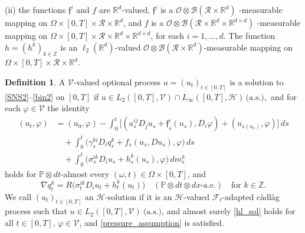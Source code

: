 \documentclass[11pt,reqno]{amsart}
\theoremstyle{definition}
\newtheorem{definition}{Definition}[section]
\theoremstyle{remark}
\newcommand\bR{\mathbb{R}}
\newcommand\bP{\mathbb{P}}
\newcommand\bZ{\mathbb{Z}}
\newcommand\frf{\mathfrak{f}}
\newcommand\cB{\mathcal{B}}
\newcommand\cO{\mathcal{O}}
\newcommand\cR{\mathcal{R}}
\newcommand{\<}{\langle}
\renewcommand{\>}{\rangle}
\begin{document}
(ii)
the functions
$\frf^i$ and $f$ are $\bR^d$-valued,
$\frf^i$ is a $\cO\otimes\mathcal B(\cR\times\bR^d)$ -measurable 
mapping on $\Omega\times[0,T]\times\cR\times\bR^d$, 
and $f$ is a $\cO\otimes\cB(\cR\times\bR^d\times\bR^{d\times d})$
-measurable mapping on 
$\Omega\times[0,T]\times\cR\times\bR^d\times\bR^{d\times d}$,
for each $i=1,\dots,d$. The function $h=(h^k)_{k\in\bZ}$ is an $\ell_2(\mathbb R^d)$-valued
$\cO\otimes\mathcal B(\cR\times\mathbb R^d)$-measurable mapping on
$\Omega\times[0,T]\times\cR\times\bR^d$. 

\begin{definition}
                                                            \label{hl_def}
A $\mathcal V$-valued optional process
$u=(u_t)_{t\in[0,T]}$
is a solution to \eqref{SNS2}--\eqref{bin2} on $[0,T]$ if
$u\in L_2([0,T],\mathcal V)\cap L_\infty([0,T],\mathcal H)\, \text{(a.s.)}, $
and for each
$\varphi\in\mathcal V$
the identity
\begin{equation} 
                                             \label{hl_sol}
\begin{aligned}
(u_t,\varphi)&=(u_0,\varphi)-
\int_0^t\Big[(a_s^{ij}D_j u_s+\mathfrak{f}_s^i(u_s),D_i \varphi)
+(u_{s(u_s)},\varphi)\Big]\,ds                              \\
&\quad
+\int_0^t\big(\gamma_s^{ki}D_i q_s^k+f_s(u_s,Du_s),\varphi\big)\,ds\\
&\quad
+\int_0^t\big(\sigma_s^{ik}D_i u_s+h_s^k(u_s),\varphi\big)\,dm_s^k
\end{aligned}
\end{equation}
holds for $\mathbb P\otimes dt$-almost every
$(\omega,t)\in\Omega\times[0,T]$, 
and 
\begin{equation}
                                 \label{pressure_assumption}
\nabla q_t^k=R\big(\sigma_t^{ik}D_i u_t+h_t^k(u_t)\big)
\quad
(\bP\otimes dt\otimes dx\text{-a.e.})\quad \text{for $k\in\bZ$}. 
\end{equation}
We call
$(u_t)_{t\in[0,T]}$
an $\mathcal H$-solution if it is an $\mathcal H$-valued 
$\mathcal F_t$-adapted c\`adl\`ag process such that
$u\in L_2([0,T],\mathcal V)\ \text{(a.s.)}$, 
and almost surely \eqref{hl_sol} holds for all
$t\in[0,T],\,\varphi\in\mathcal V$, 
and \eqref{pressure_assumption} is satisfied.
\end{definition} 
\end{document}
